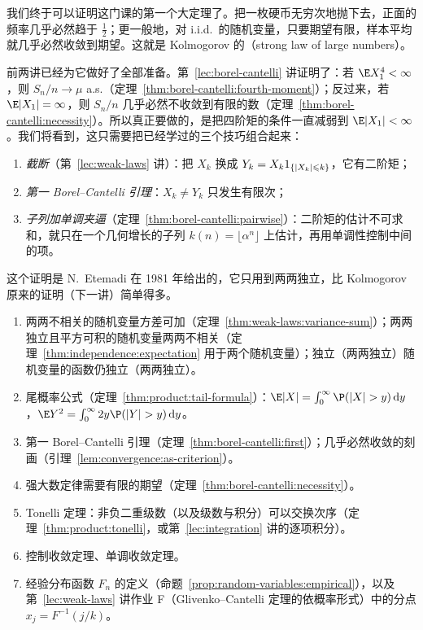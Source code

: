 \label{lec:strong-laws}

我们终于可以证明这门课的第一个大定理了。把一枚硬币无穷次地抛下去，正面的频率几乎必然趋于 $\frac12$；更一般地，对 i.i.d.\ 的随机变量，只要期望有限，样本平均就几乎必然收敛到期望。这就是 Kolmogorov 的（strong law of large numbers）。

前两讲已经为它做好了全部准备。第~\ref{lec:borel-cantelli} 讲证明了：若 $\E X_1^4<\infty$，则 $S_n/n\to\mu$ a.s.（定理~\ref{thm:borel-cantelli:fourth-moment}）；反过来，若 $\E\abs{X_1}=\infty$，则 $S_n/n$ 几乎必然不收敛到有限的数（定理~\ref{thm:borel-cantelli:necessity}）。所以真正要做的，是把四阶矩的条件一直减弱到 $\E\abs{X_1}<\infty$。我们将看到，这只需要把已经学过的三个技巧组合起来：
\begin{enumerate}
\item \emph{截断}（第~\ref{lec:weak-laws} 讲）：把 $X_k$ 换成 $Y_k=X_k1_{\{\lvert X_k\rvert\leqslant k\}}$，它有二阶矩；
\item \emph{第一 Borel--Cantelli 引理}：$X_k\neq Y_k$ 只发生有限次；
\item \emph{子列加单调夹逼}（定理~\ref{thm:borel-cantelli:pairwise}）：二阶矩的估计不可求和，就只在一个几何增长的子列 $k(n)=\lfloor\alpha^n\rfloor$ 上估计，再用单调性控制中间的项。
\end{enumerate}
这个证明是 N.\ Etemadi 在 1981 年给出的，它只用到两两独立，比 Kolmogorov 原来的证明（下一讲）简单得多。


\begin{enumerate}
\item 两两不相关的随机变量方差可加（定理~\ref{thm:weak-laws:variance-sum}）；两两独立且平方可积的随机变量两两不相关（定理~\ref{thm:independence:expectation} 用于两个随机变量）；独立（两两独立）随机变量的函数仍独立（两两独立）。
\item 尾概率公式（定理~\ref{thm:product:tail-formula}）：$\E\abs X=\int_0^\infty \P(\abs X>y)\dd y$，$\E Y^2=\int_0^\infty2y\P(\abs Y>y)\dd y$。
\item 第一 Borel--Cantelli 引理（定理~\ref{thm:borel-cantelli:first}）；几乎必然收敛的刻画（引理~\ref{lem:convergence:as-criterion}）。
\item 强大数定律需要有限的期望（定理~\ref{thm:borel-cantelli:necessity}）。
\item Tonelli 定理：非负二重级数（以及级数与积分）可以交换次序（定理~\ref{thm:product:tonelli}，或第~\ref{lec:integration} 讲的逐项积分）。
\item 控制收敛定理、单调收敛定理。
\item 经验分布函数 $F_n$ 的定义（命题~\ref{prop:random-variables:empirical}），以及第~\ref{lec:weak-laws} 讲作业 F（Glivenko--Cantelli 定理的依概率形式）中的分点 $x_j=F^{-1}(j/k)$。
\end{enumerate}


